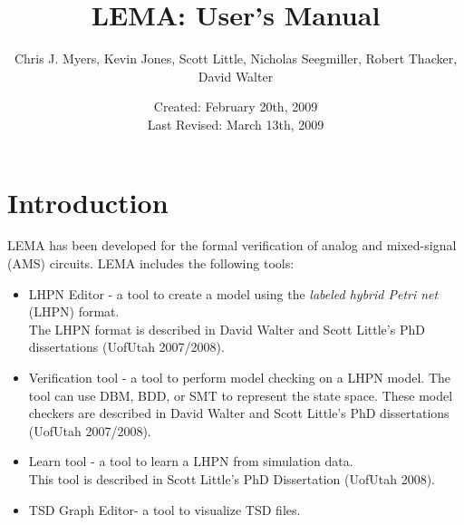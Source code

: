 \documentclass[titlepage,11pt]{article}
\title{LEMA: User's Manual}
\author{Chris J. Myers, Kevin Jones, Scott Little, Nicholas Seegmiller, Robert Thacker, David Walter}
\date{Created: February 20th, 2009\\
  Last Revised: March 13th, 2009
}
\begin{document}
\maketitle

  
\tableofcontents

\clearpage
  

\section{Introduction}

\noindent
LEMA has been developed for the formal verification of analog and mixed-signal (AMS) circuits.  LEMA includes the following tools: 

\begin{itemize}
\item LHPN Editor - a tool to create a model using the 
\emph{labeled hybrid Petri net} (LHPN) format.\\ 
The LHPN format is described in
David Walter and Scott Little's PhD dissertations
(UofUtah 2007/2008).
\item Verification tool - a tool to perform model checking on a LHPN model.  The tool can use DBM, BDD, or SMT to represent the state space.
These model checkers are described in
David Walter and Scott Little's PhD dissertations
(UofUtah 2007/2008).
\item Learn tool - a tool to learn a LHPN from simulation data.\\
This tool is described in 
Scott Little's PhD Dissertation
(UofUtah 2008).
\item TSD Graph Editor- a tool to visualize TSD files. 
\end{itemize}
\end{document}
